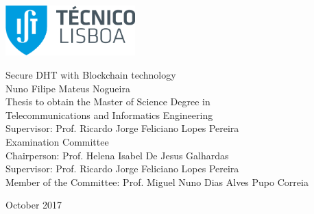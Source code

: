 \thispagestyle {empty}

\includegraphics[width=5.0cm]{Logo.png}

\begin{center}
%

\vspace{5.0cm}
{\FontLb Secure DHT with Blockchain technology} \\
\vspace{2.6cm}
{\FontMb Nuno Filipe Mateus Nogueira} \\
\vspace{1.9cm}
{\FontLn Thesis to obtain the Master of Science Degree in} \\
\vspace{0.3cm}
{\FontLb Telecommunications and Informatics Engineering} \\
\vspace{2cm}
{\FontSn Supervisor: Prof. Ricardo Jorge Feliciano Lopes Pereira} \\
\vspace{2.5cm}
{\FontMb Examination Committee} \\
\vspace{0.3cm}
{\FontSn %
  Chairperson:        Prof. Helena Isabel De Jesus Galhardas \\
Supervisor:        Prof. Ricardo Jorge Feliciano Lopes Pereira \\
Member of the Committee:            Prof. Miguel Nuno Dias Alves Pupo Correia \\
}
\vspace{1.5cm}

{\FontMb October 2017} \\
%
\end{center}

\cleardoublepage

\restoregeometry
